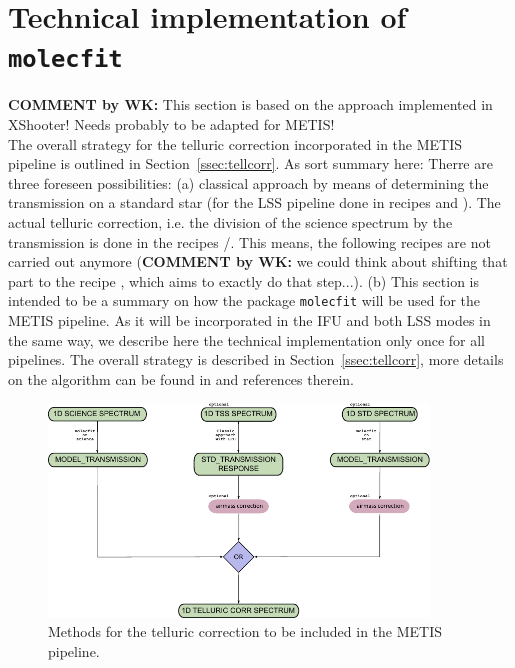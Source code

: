 \section{Technical implementation of \texttt{molecfit}}\label{app:mf}
\textbf{COMMENT by WK:} This section is based on the approach implemented in XShooter! Needs probably to be adapted for METIS!\\[1cm]

The overall strategy for the telluric correction incorporated in the METIS pipeline is outlined in Section~\ref{ssec:tellcorr}. As sort summary here: Therre are three foreseen possibilities: (a) classical approach by means of determining the transmission on a standard star (for the LSS pipeline done in recipes  and ). The actual telluric correction, i.e. the division of the science spectrum by the transmission is done in the recipes /. This means, the following recipes are not carried out anymore (\textbf{COMMENT by WK:} we could think about shifting that part to the recipe , which aims to exactly do that step...). (b) 
This section is intended to be a summary on how the package \texttt{molecfit} will be used for the \ac{METIS} pipeline. As it will be incorporated in the \ac{IFU} and both \ac{LSS} modes in the same way, we describe here the technical implementation only once for all pipelines. The overall strategy is described in Section~\ref{ssec:tellcorr}, more details on the \mf algorithm can be found in \cite{molecfit} and references therein.
\begin{figure}[ht]
  \centering
  \includegraphics[width=0.9\textwidth]{figures/tell_corr_methods.pdf}
    \caption[Methods for the telluric correction to be included in the METIS pipeline]{%
        Methods for the telluric correction to be included in the \ac{METIS} pipeline.}
  \label{Fig:tellcorrmethods}
\end{figure}

